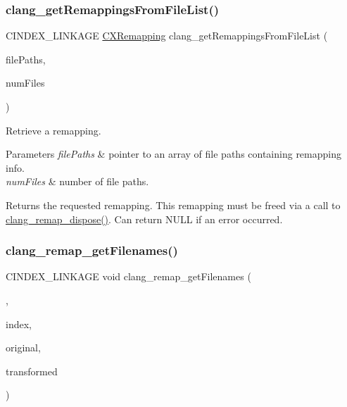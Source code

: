 \subsubsection{\texorpdfstring{clang\+\_\+get\+Remappings\+From\+File\+List()}{clang\_getRemappingsFromFileList()}}
{\footnotesize\ttfamily C\+I\+N\+D\+E\+X\+\_\+\+L\+I\+N\+K\+A\+GE \hyperlink{group__CINDEX__REMAPPING_ga04be0aca9e36a130cf1dd6fd8cbd4408}{C\+X\+Remapping} clang\+\_\+get\+Remappings\+From\+File\+List (\begin{DoxyParamCaption}\item[{const char $\ast$$\ast$}]{file\+Paths,  }\item[{unsigned}]{num\+Files }\end{DoxyParamCaption})}



Retrieve a remapping. 


\begin{DoxyParams}{Parameters}
{\em file\+Paths} & pointer to an array of file paths containing remapping info.\\
\hline
{\em num\+Files} & number of file paths.\\
\hline
\end{DoxyParams}
\begin{DoxyReturn}{Returns}
the requested remapping. This remapping must be freed via a call to {\ttfamily \hyperlink{group__CINDEX__REMAPPING_gafbd34560f59e5d3e0f5e746215b12ed7}{clang\+\_\+remap\+\_\+dispose()}}. Can return N\+U\+LL if an error occurred. 
\end{DoxyReturn}
\mbox{\label{group__CINDEX__REMAPPING_ga22fa206f0879f988bac281390063a9d7}} 
\subsubsection{\texorpdfstring{clang\+\_\+remap\+\_\+get\+Filenames()}{clang\_remap\_getFilenames()}}
{\footnotesize\ttfamily C\+I\+N\+D\+E\+X\+\_\+\+L\+I\+N\+K\+A\+GE void clang\+\_\+remap\+\_\+get\+Filenames (\begin{DoxyParamCaption}\item[{\hyperlink{group__CINDEX__REMAPPING_ga04be0aca9e36a130cf1dd6fd8cbd4408}{C\+X\+Remapping}}]{,  }\item[{unsigned}]{index,  }\item[{\hyperlink{structCXString}{C\+X\+String} $\ast$}]{original,  }\item[{\hyperlink{structCXString}{C\+X\+String} $\ast$}]{transformed }\end{DoxyParamCaption})}



